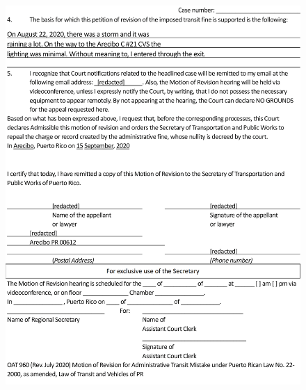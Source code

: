 \documentclass{article}
\begin{document}
\begin{figure}[H]
	\centering
	\includegraphics[width=\textwidth]{../sample_translations/target_1_2.png}
\end{figure}
\end{document}
